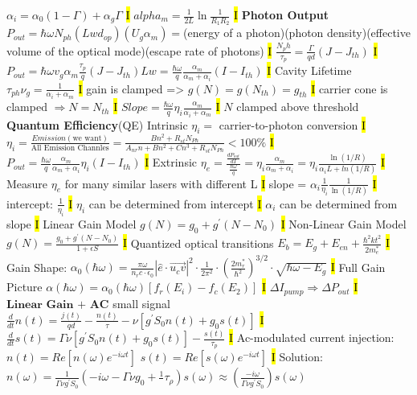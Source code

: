 \documentclass[fontsize=3]{scrartcl}
\begin{document}
$\alpha_i = \alpha_0 (1-\Gamma) + \alpha_g \Gamma$
\hl{I}
$alpha_m = \frac{1}{2L} \ln \frac{1}{R_1 R_2}$
\hl{I}
\textbf{Photon Output}
$P_{out} = \hbar \omega N_{ph} (L w d_{op}) (U_g \alpha_m) =$(energy of a photon)(photon density)(effective volume of the optical mode)(escape rate of photons)
\hl{I}
$\frac{N_ph}{\tau_p} = \frac{\Gamma}{qd}(J-J_{th})$
\hl{I}
$P_{out} = \hbar \omega v_g \alpha_m \frac{\tau_p}{q}(J - J_{th}) Lw = \frac{\hbar \omega}{q} \frac{\alpha_m}{\alpha_m + \alpha_i} (I-I_{th})$
\hl{I}
Cavity Lifetime $\tau_{ph} \nu_g = \frac{1}{\alpha_i + \alpha_m}$
\hl{I}
gain is clamped => $g(N) = g(N_{th}) = g_{th}$
\hl{I}
carrier cone is clamped $ \Rightarrow N = N_{th}$
\hl{I}
$Slope = \frac{\hbar \omega}{q} \eta_i \frac{\alpha_m}{\alpha_i + \alpha_m}$
\hl{I}
$N$ clamped above threshold
\textbf{Quantum Efficiency}(QE)
Intrinsic $\eta_i =$ carrier-to-photon conversion 
\hl{I}
$\eta_i = \frac{Emission(\text{we want})}{\text{All Emission Channles}} = \frac{Bn^2 + R_{st}N_{Ph} }{A_{nr}n + Bn^2 + Cn^3 + R_{st} N_{Ph}} < 100 \% $
\hl{I}
$P_{out} = \frac{\hbar \omega}{q} \frac{\alpha_m}{\alpha_m + \alpha_i}\eta_i (I - I_{th})$
\hl{I}
Extrinsic $\eta_e = \frac{ \frac{dP_{out}}{dI} }{\frac{\hbar \omega}{q}} = \eta_i \frac{\alpha_m}{\alpha_m + \alpha_i} = \eta_i \frac{\ln(1/R)}{\alpha_i L + ln(1/R)}$
\hl{I}
Measure $\eta_e$ for many similar lasers with different L
\hl{I}
slope = $\alpha_i \frac{1}{\eta_i} \frac{1}{\ln(1/R)}$
\hl{I}
intercept: $\frac{1}{\eta_i}$
\hl{I}
$\eta_i$ can be determined from intercept
\hl{I}
$\alpha_i$ can be determined from slope
\hl{I}
Linear Gain Model $g(N) = g_0 + g^{\prime}(N-N_0)$
\hl{I}
Non-Linear Gain Model $g(N) = \frac{g_0 + g^{\prime}(N-N_0)}{1+ \epsilon S}$
\hl{I}
Quantized optical transitions
$E_b = E_g + E_{en} + \frac{\hbar^2 k t^2}{2 m_{e}^{*}}$
\hl{I}
Gain Shape: $\alpha_0 (\hbar \omega) = \frac{\pi \omega}{n_r c \cdot \epsilon_0} |\hat{e}\cdot \vec{u_cv}|^2 \cdot \frac{1}{2\pi^2} \cdot (\frac{2m_r^*}{\hbar^2})^{3/2} \cdot \sqrt{\hbar \omega - E_g}$
\hl{I}
Full Gain Picture
$\alpha(\hbar \omega) = \alpha_0 (\hbar \omega) [f_r(E_i) - f_c(E_2)]$
\hl{I}
$\Delta I_{pump} \Rightarrow \Delta P_{out}$
\hl{I}
$\textbf{Linear Gain + AC}$
small signal $\frac{d}{dt}n(t) = \frac{j(t)}{qd} - \frac{n(t)}{\tau} - \nu [g^{\prime} S_0 n(t) + g_0 s(t)]$
\hl{I}
$\frac{d}{dt}s(t) = \Gamma \nu [g^{\prime}S_0 n(t) + g_0 s(t)] - \frac{s(t)}{\tau_p}$
\hl{I}
Ac-modulated current injection: 
$n(t) = Re[n(\omega)e^{-i \omega t}]$
$s(t) = Re[s(\omega)e^{-i \omega t}]$
\hl{I}
Solution:
$n(\omega) = \frac{1}{\Gamma \nu g^{\prime} S_0} (-i\omega - \Gamma \nu g_0 + \frac{1}{}\tau_\rho)s(\omega) \approx (\frac{-i \omega}{\Gamma \nu g^{\prime} S_0}) s(\omega) $
\end{document}
